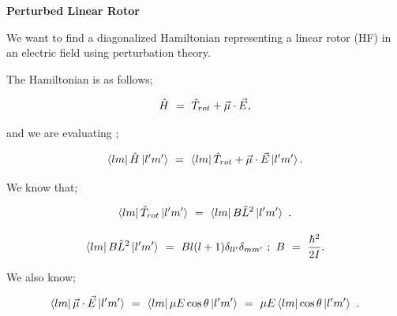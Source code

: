 \documentclass{article}
\begin{document}
\textbf{Perturbed Linear Rotor}

We want to find a diagonalized Hamiltonian representing a linear rotor (HF) in an electric field using perturbation theory. 

The Hamiltonian is as follows;

\begin{equation} \label{rotor-eq-252-1}
\hat{H} \hspace{0.125cm} = \hspace{0.125cm} \hat{T}_{rot} + \vec\mu\cdot\vec{E} \hspace{0.0125cm} , 
\end{equation}

and we are evaluating ; 

\begin{equation} \label{rotor-eq-253-1}
\bra{l m}\hat{H}\ket{l' m'} \hspace{0.125cm} = \hspace{0.125cm} \bra{l m} \hat{T}_{rot} + \vec\mu\cdot\vec{E}\ket{l' m'} . 
\end{equation}

We know that;

\begin{equation} \label{rotor-eq-254-1}
\bra{l m}\hat{T}_{rot}\ket{l' m'} \hspace{0.125cm} = \hspace{0.125cm} \bra{l m}B\hat{L}^{2}\ket{l' m'} \hspace{0.125cm} .
\end{equation}

\begin{equation} \label{rotor-eq-255-1}
\bra{l m}B\hat{L}^{2}\ket{l' m'} \hspace{0.125cm} = \hspace{0.125cm} Bl(l+1) \delta_{l l'}\delta_{m m'} \hspace{0.125cm} ; \hspace{0.125cm} B \hspace{0.125cm} = \hspace{0.125cm} \frac{\hbar^{2}}{2I} .
\end{equation}

We also know;

\begin{equation} \label{rotor-eq-256-1}
\bra{l m}\vec{\mu}\cdot\vec{E}\ket{l' m'} \hspace{0.125cm} = \hspace{0.125cm} \bra{l m}\mu E\cos\theta\ket{l' m'} \hspace{0.125cm} = \hspace{0.125cm} \mu E\bra{l m}\cos\theta\ket{l' m'} \hspace{0.125cm}.
\end{equation}
\end{document}
